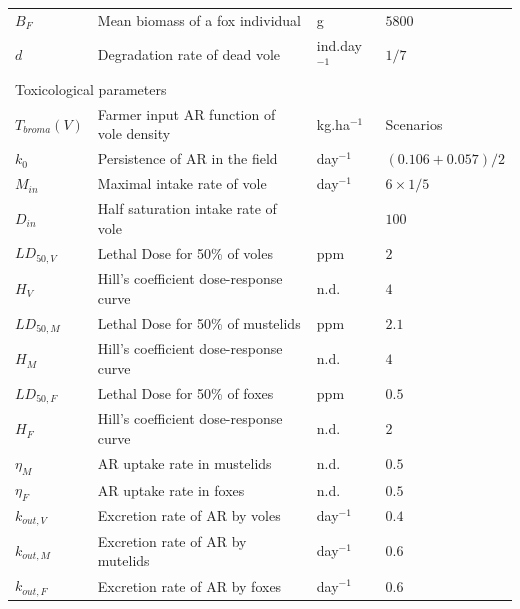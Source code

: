\documentclass[11pt]{article}
\begin{document}
\begin{table}
\begin{tabular}{l p{7cm} l p{3cm}}
$B_F$ & Mean biomass of a fox individual & g & $5800$ \\
%
$d$ & Degradation rate of dead vole & ind.day$^{-1}$ & $1/7$ \\
%
\hline
\multicolumn{2}{l}{Toxicological parameters}  & & \\
\hline
%
$T_{broma}(V)$ & Farmer input AR function of vole density & kg.ha$^{-1}$ & Scenarios \\
$k_0$ & Persistence of AR in the field & day$^{-1}$ & $(0.106+0.057)/2$ \\
%
%
$M_{in}$ & Maximal intake rate of vole & day$^{-1}$ & $6\times 1/5$ \\
%
$D_{in}$ & Half saturation intake rate of vole & & $100$\\
%
$LD_{50,V}$ & Lethal Dose for 50\% of voles & ppm & $2$ \\
$H_V$ & Hill's coefficient dose-response curve &  n.d. & $4$ \\
%
$LD_{50,M}$ & Lethal Dose for 50\% of mustelids & ppm & $2.1$ \\
$H_M$ & Hill's coefficient dose-response curve & n.d. & $4$  \\
%
$LD_{50,F}$ & Lethal Dose for 50\% of foxes & ppm & $0.5$\\
$H_F$ & Hill's coefficient dose-response curve & n.d. & $2$ \\
%
$\eta_M$ & AR uptake rate in mustelids & n.d. & $0.5$ \\
$\eta_F$ & AR uptake rate in foxes & n.d.& $0.5$\\
%
$k_{out,V}$ & Excretion rate of AR by voles & day$^{-1}$ & $0.4$\\
$k_{out,M}$ & Excretion rate of AR by mutelids & day$^{-1}$ & $0.6$\\
$k_{out,F}$ & Excretion rate of AR by foxes & day$^{-1}$ & $0.6$\\
%
\hline
\end{tabular}
\end{table}

\end{document}
